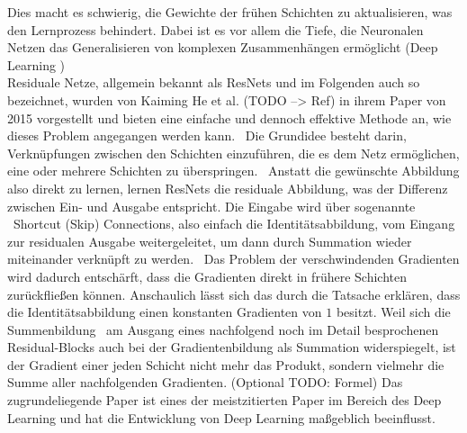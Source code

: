 Dies macht es schwierig, die Gewichte der frühen Schichten zu aktualisieren, was den Lernprozess behindert. Dabei ist es vor allem die Tiefe, die Neuronalen Netzen das Generalisieren von komplexen Zusammenhängen ermöglicht (\glqq Deep Learning \grqq{})\\
Residuale Netze, allgemein bekannt als ResNets und im Folgenden auch so bezeichnet, wurden von Kaiming He et al. (TODO --> Ref) in ihrem Paper von 2015 vorgestellt und bieten eine einfache und dennoch effektive Methode an, wie dieses Problem angegangen werden kann. \
Die Grundidee besteht darin, Verknüpfungen zwischen den Schichten einzuführen, die es dem Netz ermöglichen, eine oder mehrere Schichten zu \glqq überspringen\grqq{}. \ 
Anstatt die gewünschte Abbildung also direkt zu lernen, lernen ResNets die residuale Abbildung, was der Differenz zwischen Ein- und Ausgabe entspricht. Die Eingabe wird über sogenannte \
\glqq Shortcut (Skip) Connections\grqq{}, also einfach die Identitätsabbildung, vom Eingang zur residualen Ausgabe weitergeleitet, um dann durch Summation wieder miteinander verknüpft zu werden. \
Das Problem der verschwindenden Gradienten wird dadurch entschärft, dass die Gradienten direkt in frühere Schichten zurückfließen können. 
Anschaulich lässt sich das durch die Tatsache erklären, dass die Identitätsabbildung einen konstanten Gradienten von $1$ besitzt. Weil sich die Summenbildung \
am Ausgang eines nachfolgend noch im Detail besprochenen Residual-Blocks auch bei der Gradientenbildung als Summation widerspiegelt, ist der Gradient einer jeden Schicht nicht mehr das Produkt, sondern vielmehr die Summe aller nachfolgenden Gradienten. (Optional TODO: Formel) 
Das zugrundeliegende Paper ist eines der meistzitierten Paper im Bereich des Deep Learning und hat die Entwicklung von Deep Learning maßgeblich beeinflusst. \
